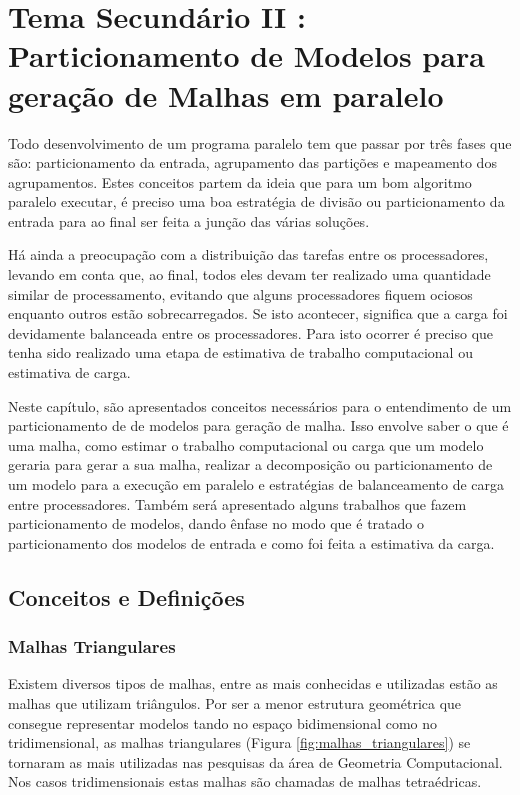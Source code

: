 \chapter{Tema Secundário II : Particionamento de Modelos para geração de Malhas em paralelo}\label{tema2}


Todo desenvolvimento de um programa paralelo tem que passar por três fases que são: particionamento da entrada, agrupamento das partições e mapeamento dos agrupamentos. Estes conceitos partem da ideia que para um bom algoritmo paralelo executar, é preciso uma boa estratégia de divisão ou particionamento da entrada para ao final ser feita a junção das várias soluções.

Há ainda a preocupação com a distribuição das tarefas entre os processadores, levando em conta que, ao final, todos eles devam ter realizado uma quantidade similar de processamento, evitando que alguns processadores fiquem ociosos enquanto outros estão sobrecarregados. Se isto acontecer, significa que a carga foi devidamente balanceada entre os processadores. Para isto ocorrer é preciso que tenha sido realizado uma etapa de estimativa de trabalho computacional ou estimativa de carga.

Neste capítulo, são apresentados conceitos necessários para o entendimento de um particionamento de de modelos para geração de malha. Isso envolve saber o que é uma malha, como estimar o trabalho computacional ou carga que um modelo geraria para gerar a sua malha, realizar a decomposição ou particionamento de um modelo para a execução em paralelo e estratégias de balanceamento de carga entre processadores. Também será apresentado alguns trabalhos que fazem particionamento de modelos, dando ênfase no modo que é tratado o particionamento dos modelos de entrada e como foi feita a estimativa da carga.


\section{Conceitos e Definições}\label{Geometria computacional}

\subsection{Malhas Triangulares}

Existem diversos tipos de malhas, entre as mais conhecidas e utilizadas estão as malhas que utilizam triângulos. Por ser a menor estrutura geométrica que consegue representar modelos tando no espaço bidimensional como no tridimensional, as  malhas triangulares (Figura \ref{fig:malhas_triangulares}) se tornaram as mais utilizadas nas pesquisas da área de Geometria Computacional. Nos casos tridimensionais estas malhas são chamadas de malhas tetraédricas.

